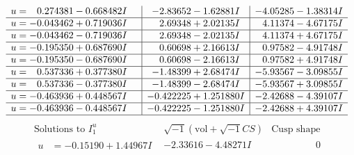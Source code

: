 \documentclass[1p]{elsarticle_modified}
\theoremstyle{definition}
\newcommand{\I}{\sqrt{-1}}
\begin{document}
$$\begin{array}{c|c|c}
\begin{aligned}
u &= \phantom{-}0.274381 - 0.668482 I\end{aligned}
 & -2.83652 - 1.62881 I & -4.05285 - 1.38314 I \\ \hline\begin{aligned}
u &= -0.043462 + 0.719036 I\end{aligned}
 & \phantom{-}2.69348 + 2.02135 I & \phantom{-}4.11374 - 4.67175 I \\ \hline\begin{aligned}
u &= -0.043462 - 0.719036 I\end{aligned}
 & \phantom{-}2.69348 - 2.02135 I & \phantom{-}4.11374 + 4.67175 I \\ \hline\begin{aligned}
u &= -0.195350 + 0.687690 I\end{aligned}
 & \phantom{-}0.60698 + 2.16613 I & \phantom{-}0.97582 - 4.91748 I \\ \hline\begin{aligned}
u &= -0.195350 - 0.687690 I\end{aligned}
 & \phantom{-}0.60698 - 2.16613 I & \phantom{-}0.97582 + 4.91748 I \\ \hline\begin{aligned}
u &= \phantom{-}0.537336 + 0.377380 I\end{aligned}
 & -1.48399 + 2.68474 I & -5.93567 - 3.09855 I \\ \hline\begin{aligned}
u &= \phantom{-}0.537336 - 0.377380 I\end{aligned}
 & -1.48399 - 2.68474 I & -5.93567 + 3.09855 I \\ \hline\begin{aligned}
u &= -0.463936 + 0.448567 I\end{aligned}
 & -0.422225 + 1.251880 I & -2.42688 - 4.39107 I \\ \hline\begin{aligned}
u &= -0.463936 - 0.448567 I\end{aligned}
 & -0.422225 - 1.251880 I & -2.42688 + 4.39107 I\\
 \hline 
 \end{array}$$\newpage$$\begin{array}{c|c|c}  
\text{Solutions to }I^u_{1}& \I (\text{vol} + \sqrt{-1}CS) & \text{Cusp shape}\\
 \hline 
\begin{aligned}
u &= -0.15190 + 1.44967 I\end{aligned}
 & -2.33616 - 4.48271 I & \phantom{-0.000000 } 0 \\ \hline\begin{aligned}

\end{aligned}
\end{array}$$
\end{document}
